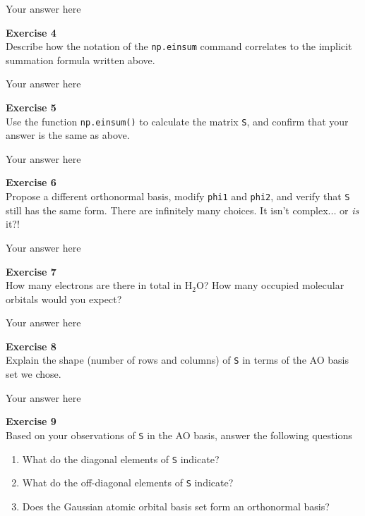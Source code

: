 \documentclass{article}
\begin{document}
Your answer here

\begin{mdframed}
\textbf{Exercise 4}\\
Describe how the notation of the \texttt{np.einsum} command correlates to the implicit summation formula written above.
\end{mdframed}

Your answer here

\begin{mdframed}
\textbf{Exercise 5}\\
Use the function \texttt{np.einsum()} to calculate the matrix \texttt{S}, and confirm that your answer is the same as above.
\end{mdframed}

Your answer here

\begin{mdframed}
\textbf{Exercise 6}\\
Propose a different orthonormal basis, modify \texttt{phi1} and \texttt{phi2}, and verify that \texttt{S} still has the same form. There are infinitely many choices. It isn't complex... or \textit{is} it?!
\end{mdframed}

Your answer here

\begin{mdframed}
\textbf{Exercise 7}\\
How many electrons are there in total in H$_2$O?
How many occupied molecular orbitals would you expect?
\end{mdframed}

Your answer here

\begin{mdframed}
\textbf{Exercise 8}\\
Explain the shape (number of rows and columns) of \texttt{S} in terms of the AO basis set we chose.
\end{mdframed}

Your answer here

\begin{mdframed}
\textbf{Exercise 9}\\
Based on your observations of \texttt{S} in the AO basis, answer the following questions

\begin{enumerate}
\item What do the diagonal elements of \texttt{S} indicate?
\item What do the off-diagonal elements of \texttt{S} indicate?
\item Does the Gaussian atomic orbital basis set form an orthonormal basis?
\end{enumerate}
\end{mdframed}
\end{document}
